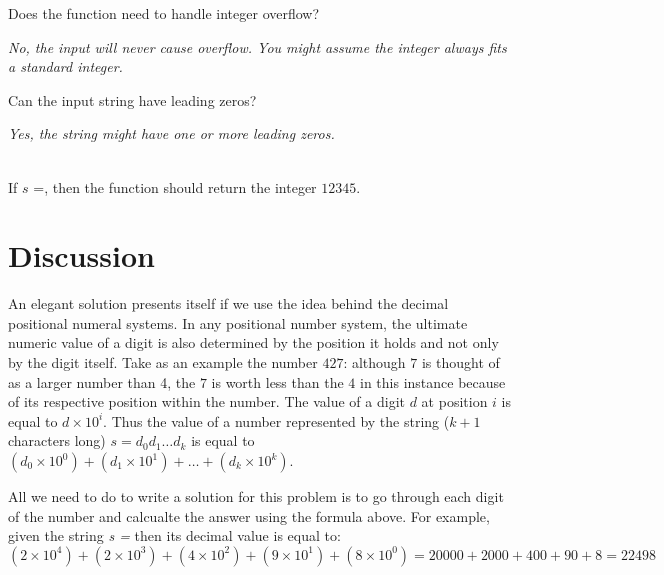 \begin{QandA}
	\item \begin{questionitem} \begin{question} Does the function need to handle integer overflow?  \end{question} 	 
    \begin{answered}
		\textit{No, the input will never cause overflow. You might assume the integer always fits a standard integer.}
	\end{answered} \end{questionitem}

	\item \begin{questionitem} \begin{question} Can the input string have leading zeros?  \end{question} 	 
    \begin{answered}
		\textit{Yes, the string might have one or more leading zeros.}
		\begin{example}
			\hfill \\
			If $s$ =, then the function should return the integer $12345$.	
		\end{example}
	\end{answered} \end{questionitem}
	
\end{QandA}

\section{Discussion}
\label{string_to_int:sec:discussion}
An elegant solution presents itself if we use the idea behind the decimal positional numeral systems.
In any positional number system, the ultimate numeric value of a digit is also determined by the position it holds and not only by the digit itself. 
Take as an example the number $427$:  although $7$ is thought of as a larger number than 4, the $7$ is worth less than the $4$ in this instance because of its respective position within the number. 
The value of a digit $d$ at position $i$ is equal to $d\times 10^i$. Thus the value of a number represented by the string ($k+1$ characters long) $s=d_0d_1 \ldots d_k$ is equal to $(d_0 \times 10^0) + (d_1 \times 10^1) + \ldots + (d_k \times 10^k)$.

All we need to do to write a solution for this problem is to go through each digit of the number and calcualte the answer using the formula above. For example, given the string \textit{s =} then its decimal value is equal to: $(2 \times 10^4) + (2 \times 10^3) + (4 \times 10^2) + (9 \times 10^1) + (8 \times 10^0) = 20000 + 2000 + 400 +90 +8 = 22498$

